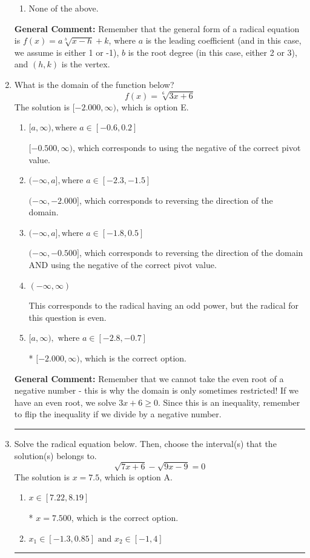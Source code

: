 \documentclass{extbook}[14pt]
\newcommand{\litem}[1]{\item #1

\rule{\textwidth}{0.4pt}}
\begin{document}
\begin{enumerate}
{\begin{enumerate}[label=\Alph*.]
\begin{multicols}{2}
\end{multicols}\item None of the above.\end{enumerate}
\textbf{General Comment:} Remember that the general form of a radical equation is $ f(x) = a \sqrt[b]{x - h} + k $, where $a$ is the leading coefficient (and in this case, we assume is either 1 or -1), $b$ is the root degree (in this case, either 2 or 3), and $(h, k)$ is the vertex.
}
\litem{
What is the domain of the function below?
\[ f(x) = \sqrt[6]{3 x + 6} \]The solution is \( [-2.000, \infty) \), which is option E.\begin{enumerate}[label=\Alph*.]
\item \( [a, \infty), \text{where } a \in [-0.6, 0.2] \)

$[-0.500, \infty)$, which corresponds to using the negative of the correct pivot value.
\item \( (-\infty, a], \text{where } a \in [-2.3, -1.5] \)

 $(-\infty, -2.000]$, which corresponds to reversing the direction of the domain.
\item \( (-\infty, a], \text{where } a \in [-1.8, 0.5] \)

$(-\infty, -0.500]$, which corresponds to reversing the direction of the domain AND using the negative of the correct pivot value.
\item \( (-\infty, \infty) \)

This corresponds to the radical having an odd power, but the radical for this question is even.
\item \( [a, \infty), \text{ where } a \in [-2.8, -0.7] \)

* $[-2.000, \infty)$, which is the correct option.
\end{enumerate}

\textbf{General Comment:} Remember that we cannot take the even root of a negative number - this is why the domain is only sometimes restricted! If we have an even root, we solve $3 x + 6 \geq 0$. Since this is an inequality, remember to flip the inequality if we divide by a negative number.
}
\litem{
Solve the radical equation below. Then, choose the interval(s) that the solution(s) belongs to.
\[ \sqrt{7 x + 6} - \sqrt{9 x - 9} = 0 \]The solution is \( x = 7.5 \), which is option A.\begin{enumerate}[label=\Alph*.]
\item \( x \in [7.22,8.19] \)

* $x = 7.500$, which is the correct option.
\item \( x_1 \in [-1.3, 0.85] \text{ and } x_2 \in [-1,4] \)


\end{enumerate}}
\end{enumerate}
\end{document}

